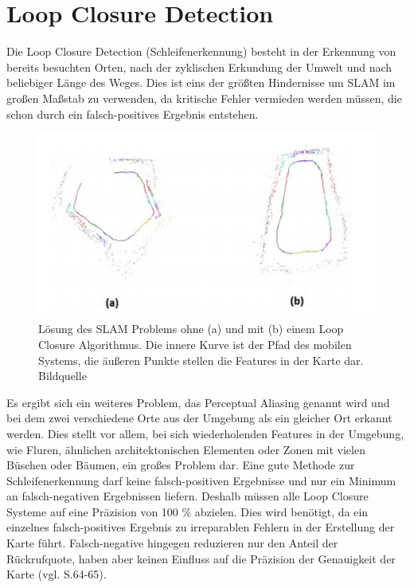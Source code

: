 \section{Loop Closure Detection}

Die \glqq Loop Closure Detection\grqq{} (Schleifenerkennung) besteht in der Erkennung von bereits besuchten Orten, nach der zyklischen Erkundung der Umwelt und nach beliebiger Länge des Weges. Dies ist eins der größten Hindernisse um SLAM im großen Maßstab zu verwenden, da kritische Fehler vermieden werden müssen, die schon durch ein falsch-positives Ergebnis entstehen.

\begin{figure}[H]
	\centering
	\includegraphics[scale=0.53]{loop.png}
	\caption{ Lösung des SLAM Problems ohne (a) und mit (b) einem Loop Closure Algorithmus. Die innere Kurve ist der Pfad des mobilen Systems, die äußeren Punkte stellen die Features in der Karte dar. Bildquelle \cite{loop_closure}}
\end{figure}  

Es ergibt sich ein weiteres Problem, das \glqq Perceptual Aliasing\grqq{} genannt wird und bei dem zwei verschiedene Orte aus der Umgebung als ein gleicher Ort erkannt werden. Dies stellt vor allem, bei sich wiederholenden Features in der Umgebung, wie Fluren, ähnlichen architektonischen Elementen oder Zonen mit vielen Büschen oder Bäumen, ein großes Problem dar. Eine gute Methode zur Schleifenerkennung darf keine falsch-positiven Ergebnisse und nur ein Minimum an falsch-negativen Ergebnissen liefern. Deshalb müssen alle Loop Closure Systeme auf eine Präzision von 100 \% abzielen. Dies wird benötigt, da ein einzelnes falsch-positives Ergebnis zu irreparablen Fehlern in der Erstellung der Karte führt. Falsch-negative hingegen reduzieren nur den Anteil der Rückrufquote, haben aber keinen Einfluss auf die Präzision der Genauigkeit der Karte (vgl. \cite{survey} S.64-65).



